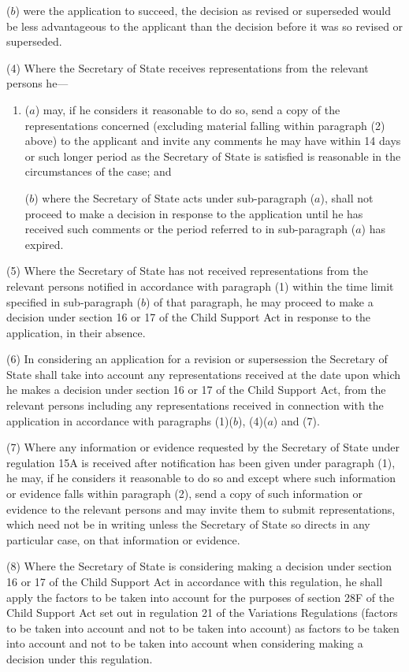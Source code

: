 \documentclass[12pt,a4paper]{article}
\begin{document}
{\begin{enumerate}
($b$) were the application to succeed, the decision as revised or superseded would be less advantageous to the applicant than the decision before it was so revised or superseded.
\end{enumerate}

(4) Where the Secretary of State receives representations from the relevant persons he—
\begin{enumerate}\item[]
($a$) may, if he considers it reasonable to do so, send a copy of the representations concerned (excluding material falling within paragraph (2) above) to the applicant and invite any comments he may have within 14 days or such longer period as the Secretary of State is satisfied is reasonable in the circumstances of the case; and

($b$) where the Secretary of State acts under sub-paragraph ($a$), shall not proceed to make a decision in response to the application until he has received such comments or the period referred to in sub-paragraph ($a$)  has expired.
\end{enumerate}

(5) Where the Secretary of State has not received representations from the relevant persons notified in accordance with paragraph (1) within the time limit specified in sub-paragraph ($b$)  of that paragraph, he may proceed to make a decision under section 16 or 17 of the Child Support Act in response to the application, in their absence.

(6) In considering an application for a revision or supersession the Secretary of State shall take into account any representations received at the date upon which he makes a decision under section 16 or 17 of the Child Support Act, from the relevant persons including any representations received in connection with the application in accordance with paragraphs (1)($b$), (4)($a$)  and (7).

(7) Where any information or evidence requested by the Secretary of State under regulation 15A is received after notification has been given under paragraph (1), he may, if he considers it reasonable to do so and except where such information or evidence falls within paragraph (2), send a copy of such information or evidence to the relevant persons and may invite them to submit representations, which need not be in writing unless the Secretary of State so directs in any particular case, on that information or evidence.

(8) Where the Secretary of State is considering making a decision under section 16 or 17 of the Child Support Act in accordance with this regulation, he shall apply the factors to be taken into account for the purposes of section 28F of the Child Support Act set out in regulation 21 of the Variations Regulations (factors to be taken into account and not to be taken into account) as factors to be taken into account and not to be taken into account when considering making a decision under this regulation.

}
\end{document}
